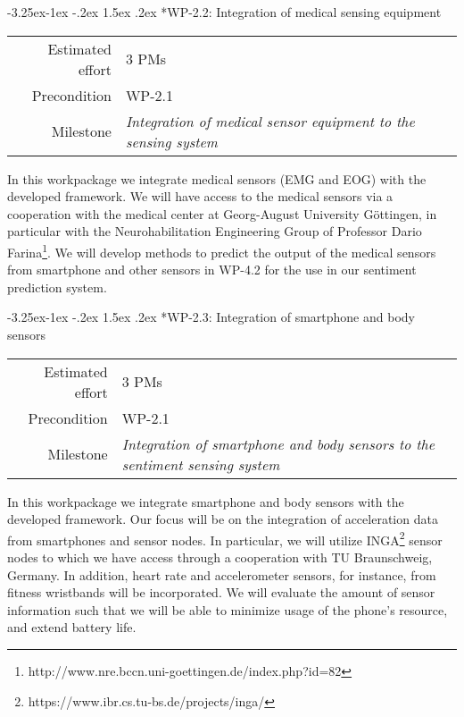 \documentclass[12pt]{article}
\makeatletter
\renewcommand\paragraph{\@startsection{paragraph}{4}{\z@}%
  {-3.25ex\@plus -1ex \@minus -.2ex}%
  {1.5ex \@plus .2ex}%
  {\normalfont\normalsize\bfseries}}
\makeatother
\begin{document}
\paragraph*{WP-2.2: Integration of medical sensing equipment}
\begin{tabular}{rl}
	Estimated effort& 3 PMs\\
	Precondition & WP-2.1\\
	Milestone & \begin{minipage}[t]{12.2cm}
		\textit{Integration of medical sensor equipment to the  sensing system}\vspace{.2cm}
	\end{minipage}
\end{tabular}

\noindent
In this workpackage we integrate medical sensors (EMG and EOG) with the developed framework. 
We will have access to the medical sensors via a cooperation with the medical center at Georg-August University Göttingen, in particular with the Neurohabilitation Engineering Group of Professor Dario Farina\footnote{http://www.nre.bccn.uni-goettingen.de/index.php?id=82}. 
We will develop methods to predict the output of the medical sensors from smartphone and other sensors in WP-4.2 for the use in our sentiment prediction system.

\paragraph*{WP-2.3: Integration of smartphone and body sensors}
\begin{tabular}{rl}
 Estimated effort& 3 PMs\\
 Precondition & WP-2.1\\
 Milestone & \begin{minipage}[t]{12.2cm}
\textit{Integration of smartphone and body sensors to the sentiment sensing system}\vspace{.2cm}
             \end{minipage}
\end{tabular}

\noindent
In this workpackage we integrate smartphone and body sensors with the developed framework. 
Our focus will be on the integration of acceleration data from smartphones and sensor nodes. 
In particular, we will utilize INGA\footnote{https://www.ibr.cs.tu-bs.de/projects/inga/} sensor nodes to which we have access through a cooperation with TU Braunschweig, Germany. 
In addition, heart rate and accelerometer sensors, for instance, from fitness wristbands will be incorporated. 
We will evaluate the amount of sensor information such that we will be able to minimize usage of the phone's resource, and extend battery life.
\end{document}
